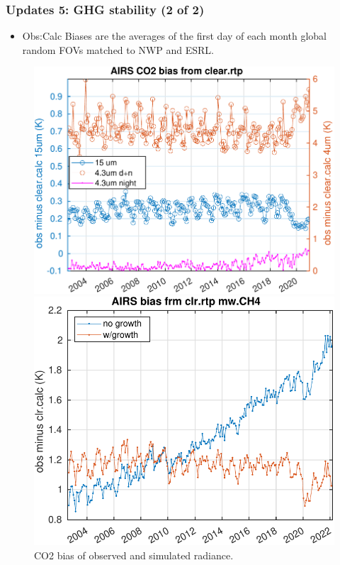 \documentclass[10pt,t]{beamer}
\begin{document}
\begin{frame}
  \frametitle{Updates 5: GHG stability (2 of 2)}
  \begin{itemize}
  \item Obs:Calc Biases are the averages of the first day of each month global random FOVs
    matched to NWP and ESRL.
  \end{itemize}

\begin{figure}
  \begin{minipage}[c]{0.3\linewidth}
    \includegraphics[width=\linewidth]{./Figs/airs_l1c_oc_bias_co2_trend.pdf}
    \caption{CO2 bias of observed and simulated radiance.}
  \end{minipage}
\hfill
  \begin{minipage}[c]{0.3\linewidth}
    \includegraphics[width=\linewidth]{./Figs/airs_l1c_oc_bias_ch4_trend.pdf}

\end{minipage}
\end{figure}
\end{frame}
\end{document}
